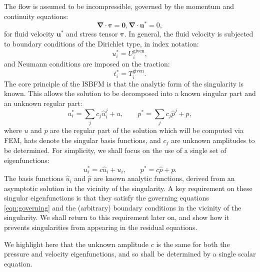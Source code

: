 \documentclass[12pt,a4paper]{article}
\numberwithin{equation}{section}
\newcommand{\Div}{\nabla\cdot}
\begin{document}
The flow is assumed to be incompressible, governed by the momentum and continuity equations:
\begin{subequations}
  \begin{equation}
    \bm\Div \bm\tau = \bm 0,
  \end{equation}
  \begin{equation}
    \bm\Div \bm u^* = 0,
    \label{eqn:continunity}
  \end{equation}
  \label{eqn:governing}
\end{subequations}
for fluid velocity $\bm u^*$ and stress tensor $\bm \tau$. In general, the fluid velocity is subjected to boundary conditions of the Dirichlet type, in index notation:
\begin{equation}
  u^*_i = U^{\text{given}}_i,
  \label{eqn:dirichlet}
\end{equation}
and Neumann conditions are imposed on the traction:
\begin{equation}
  t^*_i = T^{\text{given}}_i.
  \label{eqn:neumann}
\end{equation}
The core principle of the ISBFM is that the analytic form of the singularity is known. This allows the solution to be decomposed into a known singular part and an unknown regular part:
\begin{equation}
  u_i^* = \sum_j c_j\hat u^{j}_{i} + u, \quad\quad p^* = \sum_j c_j\hat p^j + p,
  \label{eqn:eigenfunction_decomposition_sum}
\end{equation}
where $u$ and $p$ are the regular part of the solution which will be computed via FEM, hats denote the singular basis functions, and $c_j$ are unknown amplitudes to be determined.
For simplicity, we shall focus on the use of a single set of eigenfunctions:
\begin{equation}
  u^*_i = c\hat u_{i} + u_i, \quad\quad p^* = c\hat p + p.
  \label{eqn:eigenfunction_decomposition}
\end{equation}
The basis functions $\hat u_i$ and $\hat p$ are known analytic functions, derived from an asymptotic solution in the vicinity of the singularity. A key requirement on these singular eigenfunctions is that they satisfy the governing equations \eqref{eqn:governing} and the (arbitrary) boundary conditions in the vicinity of the singularity. We shall return to this requirement later on, and show how it prevents singularities from appearing in the residual equations.

We highlight here that the unknown amplitude $c$ is the same for both the pressure and velocity eigenfunctions, and so shall be determined by a single scalar equation.
\end{document}
